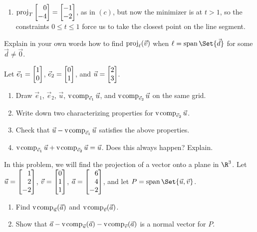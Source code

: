 \begin{exercises}
\begin{problist}
\begin{solution}
\begin{enumerate}
				\item $\Proj_{T} \mat{0\\-4}= \mat{-1\\-2}$, as
					in $(c)$, but now the minimizer is at $t>1$,
					so the constraints $0\leq t \leq 1$
					force us to take the closest point on
					the line segment.
			\end{enumerate}
		\end{solution}

		\prob Explain in your own words how to find
		$\operatorname{proj}_{\ell}(\vec v)$ when $\ell=\Span\Set{\vec d}$ for some
		$\vec d \neq \vec 0$.

		\prob Let $\vec e_{1}=\mat{1 \\ 0}$, $\vec e_{2} =\mat{0 \\ 1}$,
		and $\vec u = \mat{2 \\ 3}$.
		\begin{enumerate}
			\item Draw $\vec e_{1}$, $\vec e_{2}$, $\vec u$,
				$\operatorname{\operatorname{v\hspace{1pt}comp}}_{\vec e_1}\vec u$, and $\operatorname{\operatorname{v\hspace{1pt}comp}}_{\vec e_2}\vec
				u$ on the same grid.

			\item Write down two characterizing properties for $\operatorname{\operatorname{v\hspace{1pt}comp}}_{\vec
				e_2}\vec u$.

			\item Check that $\vec u - \operatorname{\operatorname{v\hspace{1pt}comp}}_{\vec e_1}\vec u$ satisfies
				the above properties.

			\item $\operatorname{\operatorname{v\hspace{1pt}comp}}_{{\vec e_1}}\vec u+\operatorname{\operatorname{v\hspace{1pt}comp}}_{{\vec e_2}}\vec u=\vec u$.
				Does this always happen? Explain.
		\end{enumerate}

		\prob In this problem, we will find the projection of a vector onto
		a plane in $\R^{3}$. Let $\vec u=\mat{1\\2\\-2}$, $\vec v = \mat{0\\1\\1}$,
		$\vec a = \mat{6\\4\\-2}$, and let $P=\Span\Set{\vec u,\vec v}$.


		\begin{enumerate}
			\item Find $\operatorname{\operatorname{v\hspace{1pt}comp}}_{\vec u}(\vec a)$ and $\operatorname{\operatorname{v\hspace{1pt}comp}}_{\vec v}(\vec
				a)$.

			\item \label{PROBplaneproj} Show that
				$\vec a-\operatorname{\operatorname{v\hspace{1pt}comp}}_{\vec u}(\vec a)-\operatorname{\operatorname{v\hspace{1pt}comp}}_{\vec v}(\vec
				a)$
				is a normal vector for $P$.


\end{enumerate}
\end{problist}
\end{exercises}
